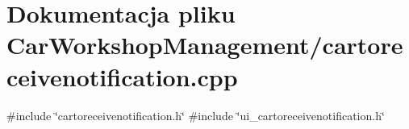 \section{Dokumentacja pliku Car\+Workshop\+Management/cartoreceivenotification.cpp}
\label{cartoreceivenotification_8cpp}
{\ttfamily \#include \char`\"{}cartoreceivenotification.\+h\char`\"{}}\newline
{\ttfamily \#include \char`\"{}ui\+\_\+cartoreceivenotification.\+h\char`\"{}}\newline
